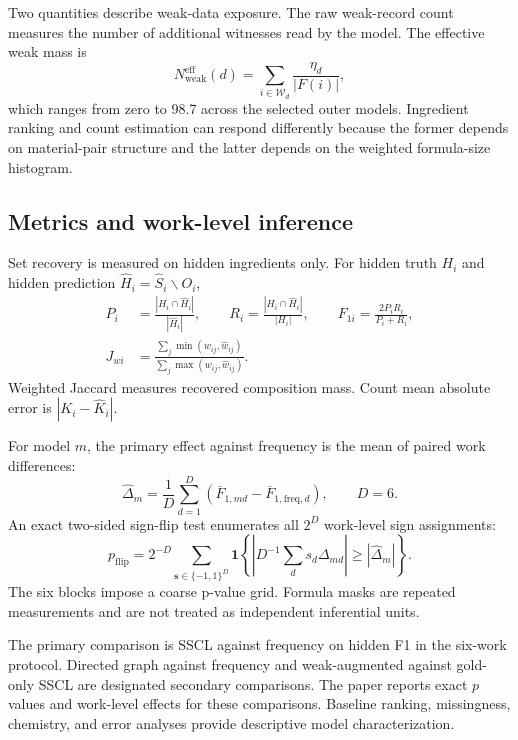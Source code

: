\documentclass[11pt,a4paper]{article}
\newcommand{\SSCL}{\textsc{SSCL}}
\newcommand{\vect}[1]{\boldsymbol{#1}}
\begin{document}
Two quantities describe weak-data exposure. The raw weak-record count measures the number of additional witnesses read by the model. The effective weak mass is
\begin{equation}
N_{\mathrm{weak}}^{\mathrm{eff}}(d)=
\sum_{i\in\mathcal{W}_d}\frac{\eta_d}{|F(i)|},
\label{eq:effectiveweak}
\end{equation}
which ranges from zero to 98.7 across the selected outer models. Ingredient ranking and count estimation can respond differently because the former depends on material-pair structure and the latter depends on the weighted formula-size histogram.

\subsection{Metrics and work-level inference}

Set recovery is measured on hidden ingredients only. For hidden truth $H_i$ and hidden prediction $\widehat H_i=\widehat S_i\mathbin{\backslash}O_i$,
\begin{align}
P_i&=\frac{|H_i\cap\widehat H_i|}{|\widehat H_i|},\qquad
R_i=\frac{|H_i\cap\widehat H_i|}{|H_i|},\qquad
F_{1i}=\frac{2P_iR_i}{P_i+R_i},\\
J_{wi}&=\frac{\sum_j\min(w_{ij},\widehat w_{ij})}
{\sum_j\max(w_{ij},\widehat w_{ij})}.
\label{eq:metrics}
\end{align}
Weighted Jaccard measures recovered composition mass. Count mean absolute error is \(|K_i-\widehat K_i|\).

For model $m$, the primary effect against frequency is the mean of paired work differences:
\begin{equation}
\widehat\Delta_m=\frac{1}{D}\sum_{d=1}^{D}
\left(\overline F_{1,md}-\overline F_{1,\mathrm{freq},d}\right),\qquad D=6.
\label{eq:estimand}
\end{equation}
An exact two-sided sign-flip test enumerates all $2^D$ work-level sign assignments:
\begin{equation}
p_{\mathrm{flip}}=2^{-D}\sum_{\vect{s}\in\{-1,1\}^{D}}
\mathbf{1}\!\left\{
\left|D^{-1}\sum_d s_d\Delta_{md}\right|\ge|\widehat\Delta_m|
\right\}.
\label{eq:signflip}
\end{equation}
The six blocks impose a coarse p-value grid. Formula masks are repeated measurements and are not treated as independent inferential units.

The primary comparison is \SSCL{} against frequency on hidden F1 in the six-work protocol. Directed graph against frequency and weak-augmented against gold-only \SSCL{} are designated secondary comparisons. The paper reports exact $p$ values and work-level effects for these comparisons. Baseline ranking, missingness, chemistry, and error analyses provide descriptive model characterization.
\end{document}
